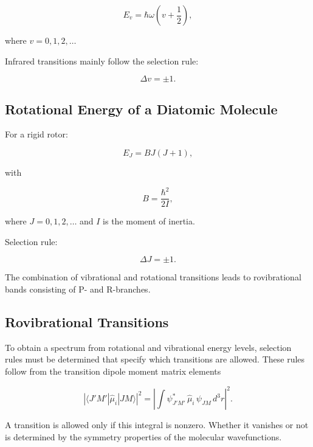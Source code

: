 \begin{equation}
E_v = \hbar \omega \left(v + \frac{1}{2}\right),
\end{equation}

where $v = 0,1,2,\dots$

Infrared transitions mainly follow the selection rule:

\begin{equation}
\Delta v = \pm 1.
\end{equation}

\subsection{Rotational Energy of a Diatomic Molecule}

For a rigid rotor:

\begin{equation}
E_J = B J(J+1),
\end{equation}

with

\begin{equation}
B = \frac{\hbar^2}{2I},
\end{equation}

where $J = 0,1,2,\dots$ and $I$ is the moment of inertia.

Selection rule:

\begin{equation}
\Delta J = \pm 1.
\end{equation}

The combination of vibrational and rotational transitions leads to rovibrational bands consisting of P- and R-branches.

\subsection{Rovibrational Transitions}

To obtain a spectrum from rotational and vibrational energy levels,
selection rules must be determined that specify which transitions are
allowed. These rules follow from the transition dipole moment matrix
elements

\begin{equation}
\left| \langle J' M' | \hat{\mu}_i | J M \rangle \right|^2
=
\left|
\int \psi_{J'M'}^{*}\, \hat{\mu}_i \,\psi_{JM}\, d^3 r
\right|^2.
\end{equation}

A transition is allowed only if this integral is nonzero. Whether it
vanishes or not is determined by the symmetry properties of the
molecular wavefunctions.

